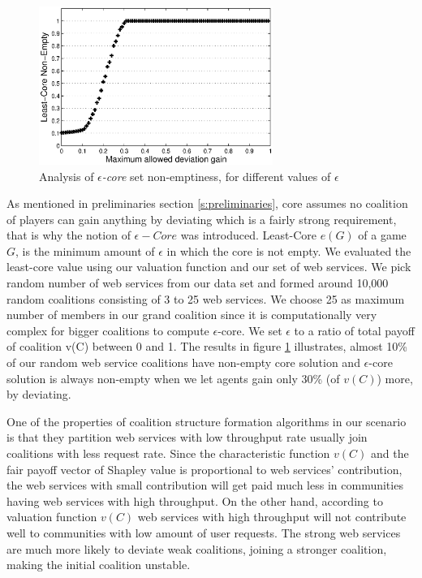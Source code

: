 \documentclass[10pt, conference, compsocconf]{IEEEtran}
\theoremstyle{plain}
\theoremstyle{definition}
\begin{document}
\begin{figure}[!t]
\centering
\includegraphics[width=3in]{least_core.eps}
\caption{Analysis of \emph{$\epsilon$-core} set non-emptiness, for different values of $\epsilon$} \label{f_leastcore}
\end{figure}

As mentioned in preliminaries section \ref{s:preliminaries}, core assumes no coalition of players can gain anything by deviating which is a fairly strong requirement, that is why the notion of $\epsilon-Core$ was introduced. Least-Core $e(G)$ of a game $G$, is the minimum amount of $\epsilon$ in which the core is not empty. We evaluated the least-core value using our valuation function and our set of web services. We pick random number of web services from our data set and formed around 10,000 random coalitions consisting of 3 to 25 web services. We choose 25 as maximum number of members in our grand coalition since it is computationally very complex for bigger coalitions to compute \emph{$\epsilon$}-core. We set $\epsilon$ to a ratio of total payoff of coalition v(C) between 0 and 1. The results in figure \ref{f_leastcore} illustrates, almost 10\% of our random web service coalitions have non-empty core solution and \emph{$\epsilon$}-core solution is always non-empty when we let agents gain only 30\% (of $v(C)$) more, by deviating. 

One of the properties of coalition structure formation algorithms in our scenario is that they partition web services with low throughput rate usually join coalitions with less request rate. Since the characteristic function $v(C)$ and  the fair payoff vector of Shapley value is proportional to web services' contribution, the web services with small contribution will get paid much less in communities having web services with high throughput. On the other hand, according to valuation function $v(C)$ web services with high throughput will not contribute well to communities with low amount of user requests. The strong web services are much more likely to deviate weak coalitions, joining a stronger coalition, making the initial coalition unstable.
\end{document}
